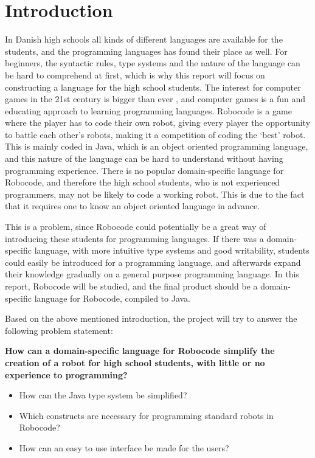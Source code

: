\chapter{Introduction}

In Danish high schools all kinds of different languages are available for the students, and the programming languages has found their place as well. For beginners, the syntactic rules, type systems and the nature of the language can be hard to comprehend at first, which is why this report will focus on constructing a language for the high school students. The interest for computer games in the 21st century is bigger than ever \citep{Wankel}, and computer games is a fun and educating approach to learning programming languages. Robocode is a game where the player has to code their own robot, giving every player the opportunity to battle each other’s robots, making it a competition of coding the ‘best’ robot. This is mainly coded in Java, which is an object oriented programming language, and this nature of the language can be hard to understand without having programming experience. There is no popular domain-specific language for Robocode, and therefore the high school students, who is not experienced programmers, may not be likely to code a working robot. This is due to the fact that it requires one to know an object oriented language in advance. 

This is a problem, since Robocode could potentially be a great way of introducing these students for programming languages. If there was a domain-specific language, with more intuitive type systems and good writability, students could easily be introduced for a programming language, and afterwards expand their knowledge gradually on a general purpose programming language. In this report, Robocode will be studied, and the final product should be a domain-specific language for Robocode, compiled to Java.
	
Based on the above mentioned introduction, the project will try to answer the following problem statement:

\textbf{How can a domain-specific language for Robocode simplify the creation of a robot for high school students, with little or no experience to programming?} 
\begin{itemize}
	\item How can the Java type system be simplified?
	\item Which constructs are necessary for programming standard robots in Robocode?
	\item How can an easy to use interface be made for the users?
\end{itemize}